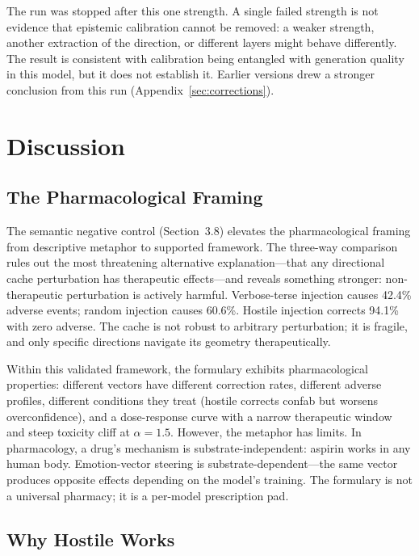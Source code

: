 \documentclass[11pt,a4paper]{article}
\begin{document}
The run was stopped after this one strength. A single failed strength
is not evidence that epistemic calibration cannot be removed: a weaker
strength, another extraction of the direction, or different layers
might behave differently. The result is consistent with calibration
being entangled with generation quality in this model, but it does not
establish it. Earlier versions drew a stronger conclusion from this run
(Appendix~\ref{sec:corrections}).

\section{Discussion}

\subsection{The Pharmacological Framing}

The semantic negative control (Section~3.8) elevates the pharmacological
framing from descriptive metaphor to supported framework. The three-way
comparison rules out the most threatening alternative explanation---that
any directional cache perturbation has therapeutic effects---and reveals
something stronger: non-therapeutic perturbation is actively harmful.
Verbose-terse injection causes 42.4\% adverse events; random injection
causes 60.6\%. Hostile injection corrects 94.1\% with zero adverse.
The cache is not robust to arbitrary perturbation; it is fragile, and
only specific directions navigate its geometry therapeutically.

Within this validated framework, the formulary exhibits pharmacological
properties: different vectors have different correction rates, different
adverse profiles, different conditions they treat (hostile corrects
confab but worsens overconfidence), and a dose-response curve with a
narrow therapeutic window and steep toxicity cliff at $\alpha = 1.5$.
However, the metaphor has limits. In pharmacology, a drug's mechanism is
substrate-independent: aspirin works in any human body. Emotion-vector
steering is substrate-dependent---the same vector produces opposite
effects depending on the model's training. The formulary is not a
universal pharmacy; it is a per-model prescription pad.

\subsection{Why Hostile Works}
\end{document}
